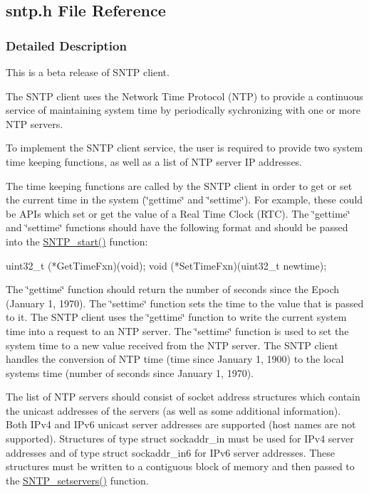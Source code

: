 \subsection{sntp.\+h File Reference}
\label{sntp_8h}


\subsubsection{Detailed Description}
This is a \textquotesingle{}beta\textquotesingle{} release of S\+N\+T\+P client.

The S\+N\+T\+P client uses the Network Time Protocol (N\+T\+P) to provide a continuous service of maintaining system time by periodically sychronizing with one or more N\+T\+P servers.

To implement the S\+N\+T\+P client service, the user is required to provide two system time keeping functions, as well as a list of N\+T\+P server I\+P addresses.

The time keeping functions are called by the S\+N\+T\+P client in order to get or set the current time in the system (\char`\"{}gettime\char`\"{} and \char`\"{}settime\char`\"{}). For example, these could be A\+P\+Is which set or get the value of a Real Time Clock (R\+T\+C). The \char`\"{}gettime\char`\"{} and \char`\"{}settime\char`\"{} functions should have the following format and should be passed into the \hyperlink{sntp_8h_a0b8765ce6d90d7d171d740b2eedde328}{S\+N\+T\+P\+\_\+start()} function\+: 
\begin{DoxyCode}
uint32\_t (*GetTimeFxn)(void);
void (*SetTimeFxn)(uint32\_t newtime);
\end{DoxyCode}


The \char`\"{}gettime\char`\"{} function should return the number of seconds since the Epoch (January 1, 1970). The \char`\"{}settime\char`\"{} function sets the time to the value that is passed to it. The S\+N\+T\+P client uses the \char`\"{}gettime\char`\"{} function to write the current system time into a request to an N\+T\+P server. The \char`\"{}settime\char`\"{} function is used to set the system time to a new value received from the N\+T\+P server. The S\+N\+T\+P client handles the conversion of N\+T\+P time (time since January 1, 1900) to the local system\textquotesingle{}s time (number of seconds since January 1, 1970).

The list of N\+T\+P servers should consist of socket address structures which contain the unicast addresses of the servers (as well as some additional information). Both I\+Pv4 and I\+Pv6 unicast server addresses are supported (host names are not supported). Structures of type \textquotesingle{}struct sockaddr\+\_\+in\textquotesingle{} must be used for I\+Pv4 server addresses and of type \textquotesingle{}struct sockaddr\+\_\+in6\textquotesingle{} for I\+Pv6 server addresses. These structures must be written to a contiguous block of memory and then passed to the \hyperlink{sntp_8h_a34409ecc254ee5abf525c69909d3df59}{S\+N\+T\+P\+\_\+setservers()} function.

